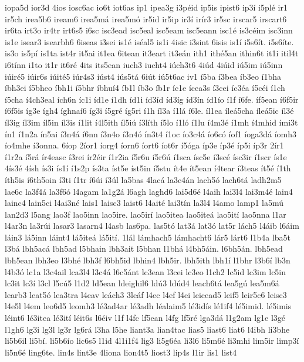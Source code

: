 {iopa5d
ior3d
4ios
iosc6ac
io6t
iot6as
ip1
ipea3g
i3péid
ip5is
ipist6
ip3í
i5plé
ir1
ir5ch
irea5b6
iream6
irea5má
irea5mó
ir5id
ir5ip
ir3í
irír3
ir5sc
irscar5
irscart6
ir6ta
irt3o
ir4tr
irt6s5
i6sc
isc3ead
isc5eal
isc5eam
isc5eann
isc1é
is3céim
isc3inn
is1e
isear3
isearbh6
6iseas
i3sei
is1é
iséal5
is1i
4isic
i3sint
6isis
is1í
i5s6ít.
i5s6íte.
is3o
is5pí
is1ta
ist4r
it5ai
it1ea
6itean
it3eart
it3eán
ith1
ithé5an
ithin6t
it1i
itil4t
i6tínn
i1to
it1r
it6ré
4its
its5ean
iuch3
iucht4
iúch3t6
4iúd
4iúid
iú5im
iú5inn
iúiré5
iúir6s
iúité5
iúr4s3
iúst4
iús5tá
6iút
iú5t6ac
iv1
í5ba
í3bea
íb3eo
í1bha
íbh3ei
í5bheo
íbh1i
í5bhr
íbhuí4
íb1l
íb3o
íb1r
íc1e
ícea3s
í3cei
íc3éa
í5céi
í1ch
í5cha
í4ch3eal
ích6n
íc1i
íd1e
í1dh
íd1i
íd3íd
íd3íg
íd3ín
íd1ío
í1f
í6fe.
íf5ean
í6f5ir
í6f5is
íg3e
ígh4
íghnaí6
íg3i
í5gré
íg5ri
í1h
íl3a
í1lá
í6le.
íl1ea
íleá5cha
íleá5ic
íl3é
íl3ig
íl3im
íl5in
íl3is
í1lit
í4l5ith
íl5iú
í3líth
í5lo
í1ló
í1lu
í4m3é
í1mh
í4mhid
ími3t
ín1
í1n2a
ín5ai
í3n4á
í6nn
í3n4o
í3n4ó
ín3t4
í1oc
ío3c4á
ío6có
íof1
íoga3dá
íomh3
ío4mhe
í3onna.
6íop
2íor1
íorg4
íorn6
íort6
íot6r
í5óga
íp3e
íp3é
íp5i
íp3r
2ír1
í1r2a
í5rá
ír4easc
í3rei
ír2éir
í1r2ia
í5r6u
í5r6ú
í1sca
ísc5e
í3scé
ísc3ir
í1scr
ís1e
4ís3é
4ísh
ís3i
ís1í
í1s2p
ís3ta
íst5e
íst5in
í5stu
ít4e
ít5ean
í4tear
í3teas
ít5é
í1th
íth5is
í6th5oin
í3ti
í1tr
í6úi
í3úl
la5bas
4lacá
la3c4án
lach5ó
lach6tá
ladh2m5
lae6c
la3f4á
la3f6ó
l4agam
la1g2á
l6agh
laghd6
lai5d6é
l4aih
lai3l4
lai3m4é
lain4
lainc4
lain5ci
l4ai3né
lais1
laisc3
laist6
l4aité
lai3tín
la3l4
l4amo
lamp1
la5mú
lan2d3
l5ang
lao3f
lao5inn
lao5ire.
lao5irí
lao5itea
lao5iteá
lao5ití
lao5nna
l1ar
l4ar3n
la3rúi
lasar3
lasarn4
l4asb
las6pa.
las5tó
lat3á
lat3ó
lat5r
lách5
l4áib
l6áim
láin3
lá5inn
láint4
lá5iteá
lá5ití.
1lál
lámhach5
lámhacht6
lár5
lárt6
l1b4a
lba5t
l3bá
lbh5acá
lbh5ad
l5bhain
lbh3ait
l5bhan
l1bhá
l4bh5áin.
l6bh5án.
lbh5ead
lbh5ean
lbh3eo
l3bhé
lbh3f
l6bh5id
lbhin4
lbh5ir.
lbh5ith
lbh1í
l1bhr
l3b6í
lb3n
l4b3ó
lc1a
l3c4ail
lca3l4
l3c4á
l6c5ánt
lc3ean
l3cei
lc3eo
l1ch2
lc5id
lc3im
lc5in
lc3it
lc3í
l3cl
l5cú5
l1d2
ld5ean
ldeighil6
ldú3
ldúd4
leach6tá
lea5gú
lea5m6á
learb3
leat5ó
lea3tra
l4eav
leách3
3leáf
l4ec
l4ef
l4ei
leicead5
leif5
leir5c6
leisc3
l4e5l
l4em
leo6d5
leomh3
lé3ad4ar
lé3adh
léalaim5
lé3idís
lé1if4
lé5imid.
lé5imis
léint6
lé3itea
lé3ití
léit6s
l6éiv
l1f
l4fc
lf5ean
l4fg
lf5ré
lga3dá
l1g2am
lg1e
l3gé
l1gh6
lg3i
lg3l
lg3r
lg6rá
l3ha
l5he
liant3a
lian4tac
lias5
liast6
liat6
l4ibh
li3bhe
li5b6il
li5bí.
li5b6ío
lic6s5
l1id
4l1i1f4
lig3
li5g6éa
li3l6
li5m6é
li3mhi
lim5ir
limp3í
li5n6é
ling6te.
lin4s
lint3e
4liona
lion4t5
liost3
lip4s
l1ir
lis1
list4
}
